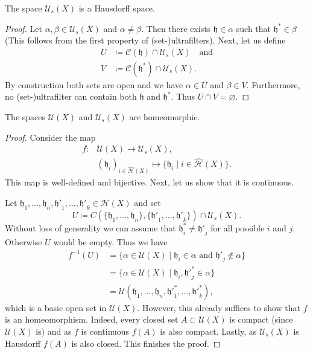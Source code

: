 \begin{lemma}
  The space \(\mathcal{U}_s(X)\) is a Hausdorff space.
\end{lemma}

\begin{proof}
  Let \(\alpha, \beta \in \mathcal{U}_s(X)\) and \(\alpha \neq \beta\). Then there exists \(\mathfrak{h} \in \alpha\) such that \(\mathfrak{h}^\ast \in \beta\) (This follows from the first property of (set-)ultrafilters). Next, let us define
  \begin{align*}
    U & \coloneqq \mathcal{C}(\mathfrak{h}) \cap \mathcal{U}_s(X)\quad \text{and}\\
    V & \coloneqq \mathcal{C}(\mathfrak{h}^\ast) \cap \mathcal{U}_s(X).
  \end{align*}
  By construction both sets are open and we have \(\alpha \in U\) and \(\beta \in V\). Furthermore, no (set-)ultrafilter can contain both \(\mathfrak{h}\) and \(\mathfrak{h}^\ast\). Thus \(U \cap V = \varnothing\). 
\end{proof}

\begin{thm}
  The spaces \(\mathcal{U}(X)\) and \(\mathcal{U}_s(X)\) are homeomorphic.
\end{thm}

\begin{proof}
  Consider the map
  \begin{align*}
    f\colon &\mathcal{U}(X) \to \mathcal{U}_s(X),\\
    &(\mathfrak{h}_i)_{i \in \mathcal{\hat H}(X)} \mapsto \{\mathfrak{h}_i \mid i \in \mathcal{\hat H}(X)\}.
  \end{align*}
  This map is well-defined and bijective. Next, let us show that it is continuous.

  Let \(\mathfrak{h}_1, \dots, \mathfrak{h}_n, \mathfrak{h'}_1, \dots,\mathfrak{h'}_k \in \mathcal{H}(X)\) and set
  \[
    U \coloneqq C(\{\mathfrak{h}_1, \dots, \mathfrak{h}_n\}, \{\mathfrak{h'}_1, \dots, \mathfrak{h'}_k\}) \cap \mathcal{U}_s(X).
  \]
  Without loss of generality we can assume that \(\mathfrak{h}^\ast_i \neq \mathfrak{h'}_j\) for all possible \(i\) and \(j\). Otherwise \(U\) would be empty. Thus we have
  \begin{align*}
    f^{-1}(U)
    & = \{\alpha \in \mathcal{U}(X) \mid \mathfrak{h}_i \in \alpha \text{ and } \mathfrak{h'}_j \notin \alpha\}\\
    & = \{\alpha \in \mathcal{U}(X) \mid \mathfrak{h}_i, \mathfrak{h'}^\ast_j \in \alpha\}\\
    & = \mathcal{U}(\mathfrak{h}_1, \dots, \mathfrak{h}_n, \mathfrak{h'}^\ast_1, \dots, \mathfrak{h'}^\ast_k),
  \end{align*}
  which is a basic open set in \(\mathcal{U}(X)\). However, this already suffices to show that \(f\) is an homeomorphism. Indeed, every closed set \(A \subset \mathcal{U}(X)\) is compact (since \(\mathcal{U}(X)\) is) and as \(f\) is continuous \(f(A)\) is also compact. Lastly, as \(\mathcal{U}_s(X)\) is Hausdorff \(f(A)\) is also closed. This finishes the proof.
\end{proof}

